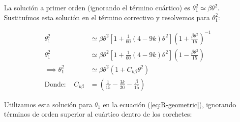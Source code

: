 La solución a primer orden (ignorando el término cuártico) es $\theta^2_ 1 \simeq \beta\theta^2$. Sustituímos esta solución en el
término correctivo y resolvemos para $\theta^2_1$:

\begin{align}
  \theta^2_1 &\simeq \beta\theta^2\left[1 + \frac{1}{60}\left(4 - 9k\right)\theta^2\right]\left(1 + \frac{\beta\theta^2}{15}\right)^{-1} \\
  \theta^2_1 &\simeq \beta\theta^2\left[1 + \frac{1}{60}\left(4 - 9k\right)\theta^2\right]\left(1 - \frac{\beta\theta^2}{15}\right) \\
  \implies \theta^2_1 &\simeq \beta\theta^2\left(1 + C_{k\beta}\theta^2\right) \\
  \mathrm{Donde:\quad}C_{k\beta} &= \left(\frac{1}{15} - \frac{3k}{20} - \frac{\beta}{15}\right)
\end{align}

Utilizamos esta solución para $\theta_1$ en la ecuación (\ref{eq:R-geometric}), ignorando términos de orden superior al cuártico
dentro de los corchetes:

